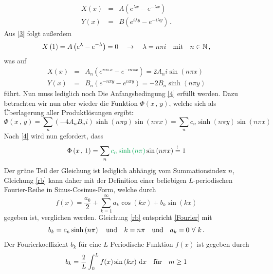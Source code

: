 \begin{eqnarray}
 X\left(x\right)&=&A\left( e^{\lambda x} - e^{-\lambda x}\right)
 \\
  Y\left(x\right)&=&B\left( e^{i\lambda y} - e^{-i\lambda y} \right)\,.
\end{eqnarray}
Aus \ref{3} folgt außerdem
\begin{equation}
X\left(1\right)=A\left(e^{\lambda}-e^{-\lambda}\right)=0\quad\rightarrow
\quad
\lambda=n\pi i
\Mit 
n \in \mathbb{N}\,,
\end{equation}
was auf 
\begin{eqnarray}
 X\left(x\right)&=&A_n\left( e^{i n\pi  x} - e^{-i n\pi x}\right)
 =2A_n i\sin\left(n\pi x\right)
 \\
  Y\left(x\right)&=&B_n\left( e^{- n\pi y} - e^{n\pi y} \right)
  =-2B_n\sinh\left(n\pi y\right)
\end{eqnarray}
führt. Nun muss lediglich noch Die Anfangsbedingung \eqref{4} erfüllt werden. Dazu betrachten wir nun aber wieder die Funktion $\Phi\left(x\,,\,y\right)$, welche sich als Überlagerung aller Produktlösungen ergibt:
\begin{equation}
\Phi\left(x\,,\,y\right)
=
\sum_n 
\left(-4 A_n B_n i\right)
\sinh\left(n\pi y\right)
\sin\left(n\pi x\right)
=
\sum_n 
c_n
\sinh\left(n\pi y\right)
\sin\left(n\pi x\right)\label{allg}
\end{equation} 
Nach \eqref{4} wird nun gefordert, dass
\begin{equation}
\Phi\left(x\,,\,1\right)
=
\sum_n 
{\color{dunkelgr}{
c_n
\sinh\left(n\pi \right)}}
\sin\left(n\pi x\right)\overset{!}{=}1\label{rb}
\end{equation} 
Der grüne Teil der Gleichung ist lediglich abhängig vom Summationsindex $n$, Gleichung \eqref{rb} kann daher mit der Definition einer beliebigen $L$-periodischen Fourier-Reihe in Sinus-Cosinus-Form, welche durch
\begin{equation}
f(x)=\frac{a_0}{2}+\sum_{k=1}^\infty a_k\cos\left(kx\right)+b_k\sin\left(kx\right)\label{Fourier}
\end{equation}
gegeben ist, verglichen werden. Gleichung \eqref{rb} entspricht \eqref{Fourier} mit 
\begin{equation}
b_k=c_n\sinh\left(n\pi\right)\Und
k=n\pi
\Und
a_k=0\,\,\forall\,\,k\,.\label{umform}
\end{equation}
Der Fourierkoeffizient $b_k$ für eine $L$-Periodische Funktion $f(x)$ ist gegeben durch 
\begin{equation}
b_k=\frac{2}{L}\int_0^L f(x)\sin\left(kx\right)\,\mathrm{d}x
\fur
m\geq 1
\end{equation}

